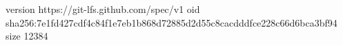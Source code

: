 version https://git-lfs.github.com/spec/v1
oid sha256:7e1fd427cdf4c84f1e7eb1b868d72885d2d55c8cacdddfce228c66d6bca3bf94
size 12384
